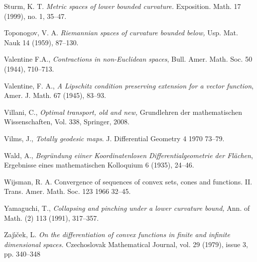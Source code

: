 \begin{thebibliography}{52}
Sturm, K. T. \textit{Metric spaces of lower bounded curvature.}  
Exposition. Math.  17  (1999),  no. 1, 35--47.

  Toponogov, V. A. \textit{Riemannian spaces of curvature bounded below,} Usp. Mat. Nauk 14 (1959), 87--130.

 Valentine F.A., 
\textit{Contractions in non-Euclidean spaces}, Bull. Amer. Math. Soc. 50 (1944), 710--713.

 Valentine, F. A., 
\textit{A Lipschitz condition preserving extension for a vector
function}, Amer. J. Math. 67 (1945), 83--93.

 Villani, C., \textit{Optimal transport, old and new,} Grundlehren der mathematischen Wissenschaften, Vol. 338, Springer, 2008.

 Vilms, J., \textit{Totally geodesic maps}.
J. Differential Geometry 4 1970 73--79. 

 Wald, A., \textit{Begr\"undung eiiner Koordinatenlosen Differentialgeometrie der Fl\"achen}, Ergebnisse eines mathematischen Kolloquium
6  (1935), 24--46.



 Wijsman, R. A. Convergence of sequences of convex sets, cones and functions. II. Trans. Amer. Math. Soc. 123 1966 32--45.

 Yamaguchi, T., \textit{Collapsing and pinching under a lower curvature
bound,} Ann. of Math. (2) 113 (1991), 317--357.

 Zaj\'{\i}\v{c}ek, L. \textit{On the differentiation of convex functions in finite and infinite dimensional spaces.} Czechoslovak Mathematical Journal, vol. 29 (1979), issue 3, pp. 340--348
\end{thebibliography}